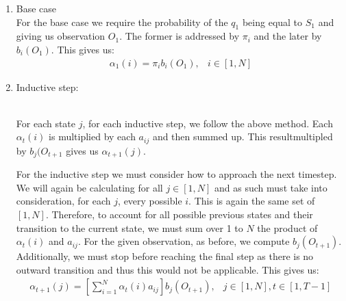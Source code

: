\begin{enumerate}[i]
    \item Base case \\
    For the base case we require the probability of the $q_1$ being equal to $S_1$ and giving us observation $O_1$. The former is addressed by $\pi_i$ and the later by $b_i(O_1)$. This gives us:
    \begin{eqnarray}
        \alpha_1(i) = \pi_i b_i(O_1), & i \in [1,N]
    \end{eqnarray}

    \item Inductive step: \\
    \begin{center}
        \\
        For each state $j$, for each inductive step, we follow the above method. Each$\alpha_t  (i)$ is multiplied by each $a_{ij}$ and then summed up. This resultmultipled by $b_j  (O_{t+1}$ gives us $\alpha_{t+1}(j)$.
    \end{center}

    For the inductive step we must consider how to approach the next timestep. We will again be calculating for all $j\in [1,N]$ and as such must take into consideration, for each $j$, every possible $i$. This is again the same set of $[1,N]$. Therefore, to account for all possible previous states and their transition to the current state, we must sum over 1 to $N$ the product of $\alpha_t(i)$ and $a_{ij}$. For the given observation, as before, we compute $b_j(O_{t+1})$. Additionally, we must stop before reaching the final step as there is no outward transition and thus this would not be applicable. This gives us:
    \begin{eqnarray}
        \alpha_{t+1}(j) = \left[\sum_{i=1}^N \alpha_t(i)a_{ij}\right] b_j(O_{t+1}), & j \in [1,N], t \in [1,T-1]
    \end{eqnarray}


\end{enumerate}
